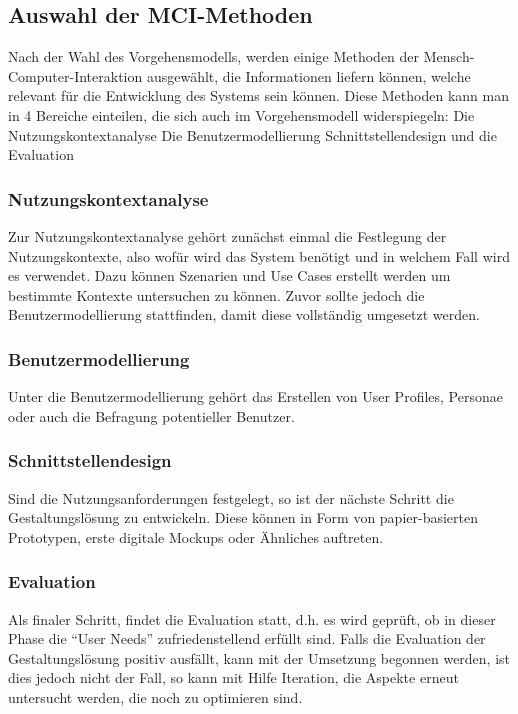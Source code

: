 \documentclass[12pt]{scrartcl}
\begin{document}
\subsection{Auswahl der MCI-Methoden}

Nach der Wahl des Vorgehensmodells, werden einige Methoden der Mensch-Computer-Interaktion ausgewählt, die Informationen liefern können, welche relevant für die Entwicklung des Systems sein können.
Diese Methoden kann man in 4 Bereiche einteilen, die sich auch im Vorgehensmodell widerspiegeln:
Die Nutzungskontextanalyse
Die Benutzermodellierung
Schnittstellendesign und die
Evaluation

\subsubsection{Nutzungskontextanalyse}

Zur Nutzungskontextanalyse gehört zunächst einmal die Festlegung der Nutzungskontexte, also wofür wird das System benötigt und in welchem Fall wird es verwendet. Dazu können Szenarien und Use Cases erstellt werden um bestimmte Kontexte untersuchen zu können. Zuvor sollte jedoch die Benutzermodellierung stattfinden, damit diese vollständig umgesetzt werden.

\subsubsection{Benutzermodellierung}

Unter die Benutzermodellierung gehört das Erstellen von User Profiles, Personae oder auch die Befragung potentieller Benutzer. 

\subsubsection{Schnittstellendesign}

Sind die Nutzungsanforderungen festgelegt, so ist der nächste Schritt die Gestaltungslösung zu entwickeln. Diese können in Form von papier-basierten Prototypen, erste digitale Mockups oder Ähnliches auftreten.

\subsubsection{Evaluation}

Als finaler Schritt, findet die Evaluation statt, d.h. es wird geprüft, ob in dieser Phase die “User Needs” zufriedenstellend erfüllt sind. Falls die Evaluation der Gestaltungslösung positiv ausfällt, kann mit der Umsetzung begonnen werden, ist dies jedoch nicht der Fall, so kann mit Hilfe Iteration, die Aspekte erneut untersucht werden, die noch zu optimieren sind.
\end{document}
